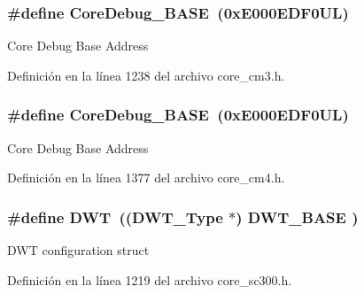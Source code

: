 \subsubsection[{\texorpdfstring{Core\+Debug\+\_\+\+B\+A\+SE}{CoreDebug_BASE}}]{\setlength{\rightskip}{0pt plus 5cm}\#define Core\+Debug\+\_\+\+B\+A\+SE~(0x\+E000\+E\+D\+F0\+U\+L)}\hypertarget{group___c_m_s_i_s__core__base_ga680604dbcda9e9b31a1639fcffe5230b}{}\label{group___c_m_s_i_s__core__base_ga680604dbcda9e9b31a1639fcffe5230b}
Core Debug Base Address 

Definición en la línea 1238 del archivo core\+\_\+cm3.\+h.

\subsubsection[{\texorpdfstring{Core\+Debug\+\_\+\+B\+A\+SE}{CoreDebug_BASE}}]{\setlength{\rightskip}{0pt plus 5cm}\#define Core\+Debug\+\_\+\+B\+A\+SE~(0x\+E000\+E\+D\+F0\+U\+L)}\hypertarget{group___c_m_s_i_s__core__base_ga680604dbcda9e9b31a1639fcffe5230b}{}\label{group___c_m_s_i_s__core__base_ga680604dbcda9e9b31a1639fcffe5230b}
Core Debug Base Address 

Definición en la línea 1377 del archivo core\+\_\+cm4.\+h.

\subsubsection[{\texorpdfstring{D\+WT}{DWT}}]{\setlength{\rightskip}{0pt plus 5cm}\#define D\+WT~(({\bf D\+W\+T\+\_\+\+Type}       $\ast$)     {\bf D\+W\+T\+\_\+\+B\+A\+SE}      )}\hypertarget{group___c_m_s_i_s__core__base_gabbe5a060185e1d5afa3f85b14e10a6ce}{}\label{group___c_m_s_i_s__core__base_gabbe5a060185e1d5afa3f85b14e10a6ce}
D\+WT configuration struct 

Definición en la línea 1219 del archivo core\+\_\+sc300.\+h.


